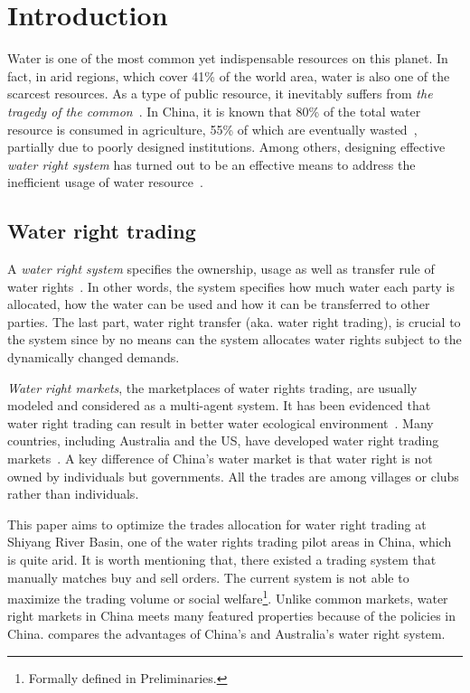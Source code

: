 \documentclass{aamas2015}
\begin{document}



\section{Introduction}
Water is one of the most common yet indispensable resources on this planet. In fact, in arid regions, which cover 41\% of the world area, water is also one of the scarcest resources. As a type of public resource, it inevitably suffers from {\em the tragedy of the common}~\cite{Hardin1968}. In China,  it is known that 80\% of the total water resource is consumed in agriculture, 55\% of which are eventually wasted~\cite{liu2007analysis}, partially due to poorly designed institutions. Among others, designing effective {\em water right system} has turned out to be an effective means to address the inefficient usage of water resource~\cite{ostrom2007private}.

\subsection{Water right trading}
A \textit{water right system} specifies the ownership, usage as well as transfer rule of water rights~\cite{scott1995evolution}. In other words, the system specifies how much water each party is allocated, how the water can be used and how it can be transferred to other parties. The last part, water right transfer (aka. water right trading), is crucial to the system since by no means can the system allocates water rights subject to the dynamically changed demands.

\textit{Water right markets}, the marketplaces of water rights trading, are usually modeled and considered as a multi-agent system\cite{Zhao2009,giret2011mas,almajano2012v}. It has been evidenced that water right trading can result in better water ecological environment~\cite{huang2000water}. Many countries, including Australia and the US, have developed water right trading markets~\cite{zhao2003china}. A key difference of China's water market is that water right is not owned by individuals but governments. All the trades are among villages or clubs rather than individuals\cite{Brown2006}. 

This paper aims to optimize the trades allocation for water right trading at Shiyang River Basin, one of the water rights trading pilot areas in China, which is quite arid. It is worth mentioning that, there existed a trading system that manually matches buy and sell orders. The current system is not able to maximize the trading volume or social welfare\footnote{Formally defined in Preliminaries.}. Unlike common markets, water right markets in China meets many featured properties because of the policies in China. \cite{speed2009comparison} compares the advantages of China's and Australia's water right system.
\end{document}
